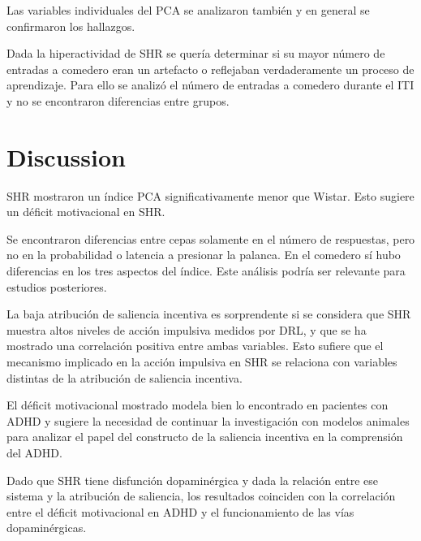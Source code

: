 \documentclass[a4paper,12pt]{article}
\begin{document}
Las variables individuales del PCA se analizaron también y en general se confirmaron los hallazgos.

Dada la hiperactividad de SHR se quería determinar si su mayor número de entradas a comedero eran un artefacto o reflejaban verdaderamente un proceso de aprendizaje.
Para ello se analizó el número de entradas a comedero durante el ITI y no se encontraron diferencias entre grupos.

\section{Discussion}

SHR mostraron un índice PCA significativamente menor que Wistar.
Esto sugiere un déficit motivacional en SHR.

Se encontraron diferencias entre cepas solamente en el número de respuestas, pero no en la probabilidad o latencia a presionar la palanca.
En el comedero sí hubo diferencias en los tres aspectos del índice.
Este análisis podría ser relevante para estudios posteriores.

La baja atribución de saliencia incentiva es sorprendente si se considera que SHR muestra altos niveles de acción impulsiva medidos por DRL, y que se ha mostrado una correlación positiva entre ambas variables.
Esto sufiere que el mecanismo implicado en la acción impulsiva en SHR se relaciona con variables distintas de la atribución de saliencia incentiva.

El déficit motivacional mostrado modela bien lo encontrado en pacientes con ADHD y sugiere la necesidad de continuar la investigación con modelos animales para analizar el papel del constructo de la saliencia incentiva en la comprensión del ADHD.

Dado que SHR tiene disfunción dopaminérgica y dada la relación entre ese sistema y la atribución de saliencia, los resultados coinciden con la correlación entre el déficit motivacional en ADHD y el funcionamiento de las vías dopaminérgicas.
\end{document}
